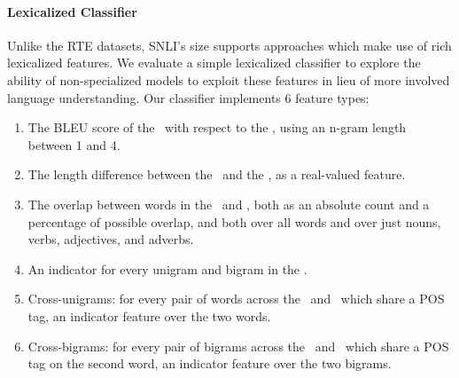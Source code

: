 \paragraph{Lexicalized Classifier}
Unlike the RTE datasets, SNLI's size supports approaches which make use of rich lexicalized features.
We evaluate a simple lexicalized classifier to explore the ability of non-specialized models to exploit these features in lieu of more involved language understanding.
Our classifier implements 6 feature types:
\begin{enumerate}
\setlength\itemsep{-0.25em}
  \item The BLEU score of the \hypothesis\ with respect
  to the \premise, using an n-gram length between 1 and 4.

  \item The length difference between the \hypothesis\ and the \premise, as a real-valued
  feature.

  \item The overlap between words in the \premise\ and \hypothesis,
  both as an absolute count and a percentage of possible overlap, and both over 
  all words and over just nouns, verbs, adjectives, 
  and adverbs.
  
  \item\label{lst:ngram} An indicator for every unigram and bigram in the \hypothesis.

  \item\label{lst:unigram} Cross-unigrams: for every pair of words across the \premise\ and \hypothesis\ which share a 
  POS tag, an indicator feature over the two words.
  
  \item\label{lst:bigram} Cross-bigrams: for every pair of bigrams across the \premise\ and \hypothesis\ which share a 
  POS tag on the second word, an indicator feature over the two bigrams.
\end{enumerate}

%
%

